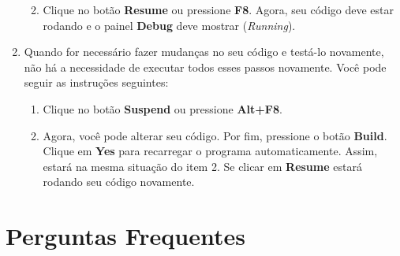 \documentclass[a4paper, 12pt]{article}
\begin{document}
\begin{enumerate}
\begin{enumerate}
\begin{figure}[!htbp]
		\end{figure}
		
		\item Clique no botão \textbf{Resume} ou pressione \textbf{F8}. Agora, seu código deve estar rodando e o painel \textbf{Debug} deve mostrar (\textit{Running}).
	\end{enumerate}
	
	\item Quando for necessário fazer mudanças no seu código e testá-lo novamente, não há a necessidade de executar todos esses passos novamente. Você pode seguir as instruções seguintes:
	
	\begin{enumerate}
      	\item Clique no botão \textbf{Suspend} ou pressione \textbf{Alt+F8}.
		\item Agora, você pode alterar seu código. Por fim, pressione o botão \textbf{Build}. Clique em \textbf{Yes} para recarregar o programa automaticamente. Assim, estará na mesma situação do item 2. Se clicar em \textbf{Resume} estará rodando seu código novamente.
	\end{enumerate}
	
\end{enumerate}

\section{Perguntas Frequentes}
\end{document}
